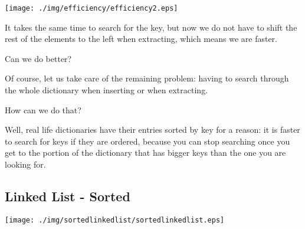 \documentclass[a4paper, 9pt]{extarticle}
\begin{document}
\begin{multicols}{2}
\begin{center}
  \texttt{[image: ./img/efficiency/efficiency2.eps]}
\end{center}
\columnbreak

It takes the same time to search for the key, but now we do not have to shift
the rest of the elements to the left when extracting, which means we are
faster.

Can we do better?

Of course, let us take care of the remaining problem: having to search through the
whole dictionary when inserting or when extracting.

How can we do that?

Well, real life dictionaries have their entries sorted by key for a reason: it
is faster to search for keys if they are ordered, because you can stop
searching once you get to the portion of the dictionary that has bigger keys
than the one you are looking for.

\end{multicols}


\newpage

\subsection{Linked List - Sorted}

\begin{center}
  \texttt{[image: ./img/sortedlinkedlist/sortedlinkedlist.eps]}
\end{center}
\end{document}
